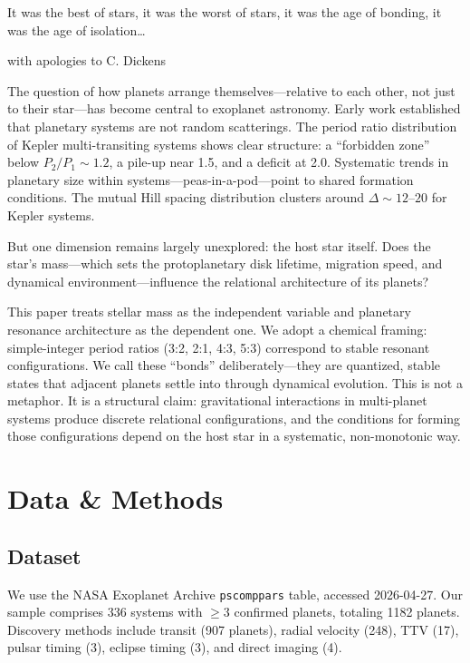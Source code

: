 \documentclass[twocolumn]{aastex631}
\begin{document}
\epigraph{It was the best of stars, it was the worst of stars, it was the age
of bonding, it was the age of isolation\ldots}{with apologies to C. Dickens}

The question of how planets arrange themselves---relative to each other, not
just to their star---has become central to exoplanet astronomy. Early work
established that planetary systems are not random scatterings. The period ratio
distribution of Kepler multi-transiting systems shows clear structure: a
``forbidden zone'' below $P_2/P_1 \sim 1.2$, a pile-up near 1.5, and a deficit
at 2.0\citep{fabrycky2014,fang_margot_2012}. Systematic trends in planetary
size within systems---peas-in-a-pod---point to shared formation
conditions\citep{weiss2018,millholland2021}. The mutual Hill spacing
distribution clusters around $\Delta \sim 12$--$20$ for Kepler
systems\citep{puwu2015,fang_margot_2013}.

But one dimension remains largely unexplored: the host star itself. Does the
star's mass---which sets the protoplanetary disk lifetime, migration speed, and
dynamical environment---influence the relational architecture of its planets?

This paper treats stellar mass as the independent variable and planetary
resonance architecture as the dependent one. We adopt a chemical framing:
simple-integer period ratios (3:2, 2:1, 4:3, 5:3) correspond to stable resonant
configurations. We call these ``bonds'' deliberately---they are quantized,
stable states that adjacent planets settle into through dynamical evolution.
This is not a metaphor. It is a structural claim: gravitational interactions in
multi-planet systems produce discrete relational configurations, and the
conditions for forming those configurations depend on the host star in a
systematic, non-monotonic way.

\section{Data \& Methods}
\label{sec:methods}

\subsection{Dataset}

We use the NASA Exoplanet Archive \texttt{pscomppars} table, accessed 2026-04-27.
Our sample comprises 336 systems with $\geq 3$ confirmed planets, totaling 1182
planets. Discovery methods include transit (907 planets), radial velocity (248),
TTV (17), pulsar timing (3), eclipse timing (3), and direct imaging (4).
\end{document}
